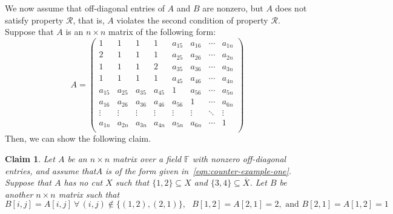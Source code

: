 \documentclass[11pt,letterpaper]{article}
\newcommand{\comp}[1]{\overline{#1}}
\newcommand{\F}{\mathbb{F}}
\newtheorem{claim}{Claim}[section]
\newcommand{\prop}{\mathcal{R}}
\begin{document}
{{{{ We now assume that off-diagonal entries of $A$ and $B$ are nonzero, but $A$ does not satisfy property $\prop$, that is, $A$ violates the second condition of property $\prop$. Suppose that $A$ is an $n\times n$ matrix of the following form:
\begin{equation}
\label{eqn:counter-example-one}
A=
\begin{pmatrix}
1                &  1                & 1                & 1          & a_{15}      & a_{16} &\cdots & a_{1n}\\
2                &  1                & 1                & 1          & a_{25}      & a_{26} & \cdots  & a_{2n}\\
1                &  1                & 1                & 2          & a_{35}      & a_{36} & \cdots  & a_{3n}\\
1                &  1                & 1                & 1          & a_{45}      &  a_{46} & \cdots  & a_{4n}\\
a_{15}           &  a_{25}           & a_{35}           & a_{45}     & 1           & a_{56} & \cdots  & a_{5n}\\
a_{16}           &  a_{26}           & a_{36}           & a_{46}     & a_{56}      & 1 & \cdots  & a_{6n}\\
\vdots           &  \vdots           & \vdots           & \vdots     &\vdots    &\vdots   &\ddots  & \vdots\\
a_{1n}           &  a_{2n}           & a_{3n}           & a_{4n}     & a_{5n}      & a_{6n} & \cdots & 1\\
\end{pmatrix}
\end{equation}
Then, we can show the following claim.
\begin{claim}
\label{clm:counter-example-tool}
Let $A$ be an $n\times n$ matrix over a field $\F$ with nonzero off-diagonal entries, and assume that$A$ is of the form given in~\cref{eqn:counter-example-one}. Suppose that $A$ has no cut $X$ such that $\{1,2\}\subseteq X$ and $\{3,4\}\subseteq \comp{X}$. Let $B$ be another $n\times n$ matrix such that 
\begin{equation}
\label{eqn:counter-example-two}
B[i,j]=A[i,j]\ \forall\, (i,j)\notin\{(1,2), (2,1)\},\ \ \   B[1,2]=A[2,1]=2, \text{ and } B[2,1]=A[1,2]=1

\end{equation}
\end{claim}}}}}
\end{document}
